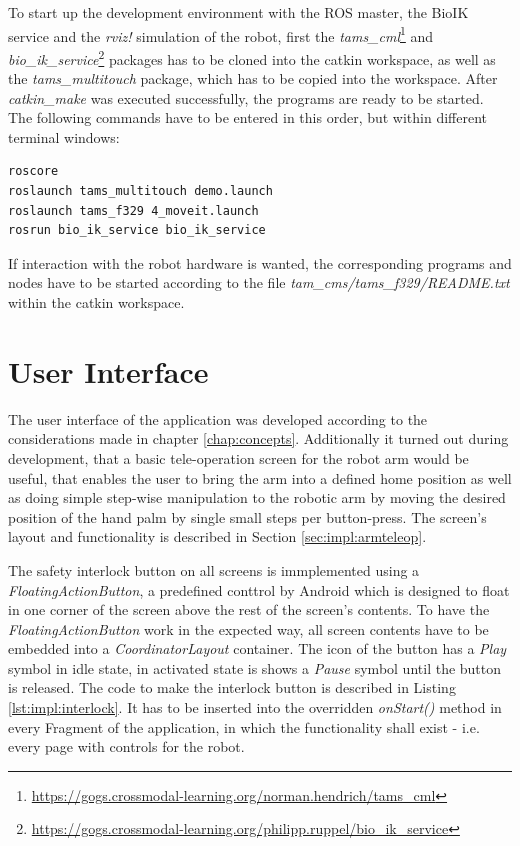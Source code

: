 To start up the development environment with the ROS master, the BioIK service and the \textit{rviz!} simulation of the robot, first the \textit{tams\_cml}\footnote{\url{https://gogs.crossmodal-learning.org/norman.hendrich/tams_cml}} and \textit{bio\_ik\_service}\footnote{\url{https://gogs.crossmodal-learning.org/philipp.ruppel/bio_ik_service}} packages has to be cloned into the catkin workspace, as well as the \textit{tams\_multitouch} package, which has to be copied into the workspace. After \textit{catkin\_make} was executed successfully, the programs are ready to be started. The following commands have to be entered in this order, but within different terminal windows:
\begin{lstlisting}[caption={Commands to start up the development environment}]
roscore
roslaunch tams_multitouch demo.launch
roslaunch tams_f329 4_moveit.launch
rosrun bio_ik_service bio_ik_service
\end{lstlisting}

If interaction with the robot hardware is wanted, the corresponding programs and nodes have to be started according to the file \textit{tam\_cms/tams\_f329/README.txt} within the catkin workspace.

\section{User Interface}
\label{sec:impl:ui}

The user interface of the application was developed according to the considerations made in chapter \ref{chap:concepts}. Additionally it turned out during development, that a basic tele-operation screen for the robot arm would be useful, that enables the user to bring the arm into a defined home position as well as doing simple step-wise manipulation to the robotic arm by moving the desired position of the hand palm by single small steps per button-press. The screen's layout and functionality is described in Section \ref{sec:impl:armteleop}.

The safety interlock button on all screens is immplemented using a \textit{FloatingActionButton}, a predefined conttrol by Android which is designed to float in one corner of the screen above the rest of the screen's contents. To have the \textit{FloatingActionButton} work in the expected way, all screen contents have to be embedded into a \textit{CoordinatorLayout} container. The icon of the button has a \textit{Play} symbol in idle state, in activated state is shows a \textit{Pause} symbol until the button is released. The code to make the interlock button is described in Listing \ref{lst:impl:interlock}. It has to be inserted into the overridden \textit{onStart()} method in every Fragment of the application, in which the functionality shall exist - i.e. every page with controls for the robot.

